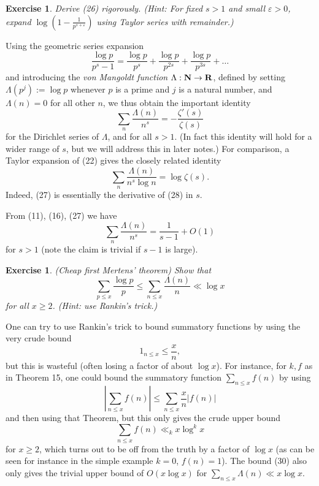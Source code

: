 \documentclass[10pt,reqno]{amsart}
\newtheorem{exercise}[theorem]{Exercise}
\begin{document}
\begin{exercise}
    Derive (26) rigorously. (Hint: For fixed $s>1$ and small $\varepsilon>0$, expand $\log(1 - \frac{1}{p^{s+\varepsilon}})$ using Taylor series with remainder.)
\end{exercise}

Using the geometric series expansion
%
\[  \frac{\log p}{p^s - 1} = \frac{\log p}{p^s} + \frac{\log p}{p^{2s}} + \frac{\log p}{p^{3s}} + \dots \]
%
and introducing the \emph{von Mangoldt function} $\Lambda: {\bf N} \rightarrow {\bf R}$, defined by setting $\Lambda(p^j) := \log p$ whenever $p$ is a prime and $j$ is a natural number, and $\Lambda(n) = 0$ for all other $n$, we thus obtain the important identity
%
\begin{equation}   \sum_n \frac{\Lambda(n)}{n^s} = -\frac{\zeta'(s)}{\zeta(s)} \end{equation}
%
for the Dirichlet series of $\Lambda$, and for all $s>1$. (In fact this identity will hold for a wider range of $s$, but we will address this in later notes.) For comparison, a Taylor expansion of (22) gives the closely related identity
%
\begin{equation}   \sum_n \frac{\Lambda(n)}{n^s \log n} = \log \zeta(s). \end{equation}
%
Indeed, (27) is essentially the derivative of (28) in $s$.

From (11), (16), (27) we have
%
\begin{equation}   \sum_n \frac{\Lambda(n)}{n^s} = \frac{1}{s-1} + O(1) \end{equation}
%
for $s>1$ (note the claim is trivial if $s-1$ is large).

\begin{exercise} (Cheap first Mertens’ theorem) Show that
    \[  \sum_{p \leq x} \frac{\log p}{p} \leq \sum_{n \leq x} \frac{\Lambda(n)}{n} \ll \log x\]
    for all $x \geq 2$. (Hint: use Rankin’s trick.)
\end{exercise}

One can try to use Rankin’s trick to bound summatory functions by using the very crude bound
%
\begin{equation}   1_{n \leq x} \leq \frac{x}{n}, \end{equation}
%
but this is wasteful (often losing a factor of about $\log x$). For instance, for $k, f$ as in Theorem 15, one could bound the summatory function $\sum_{n \leq x} f(n)$ by using
%
\[  |\sum_{n \leq x} f(n)| \leq \sum_{n \leq x} \frac{x}{n} |f(n)|\]
%
and then using that Theorem, but this only gives the crude upper bound
%
\[  \sum_{n \leq x} f(n) \ll_k x \log^k x\]
%
for $x \geq 2$, which turns out to be off from the truth by a factor of $\log x$ (as can be seen for instance in the simple example $k=0$, $f(n)=1$). The bound (30) also only gives the trivial upper bound of $O(x \log x)$ for $\sum_{n \leq x} \Lambda(n) \ll x \log x$.
\end{document}
